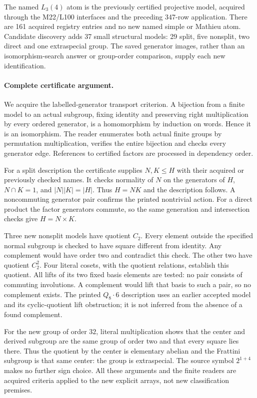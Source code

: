 \documentclass[11pt]{article}
\begin{document}
The named $L_3(4)$ atom is the previously certified projective model,
acquired through the M22/L100 interfaces and the preceding 347-row
application. There are 161 acquired registry entries and no new named
simple or Mathieu atom. Candidate discovery adds 37 small structural
models: 29 split, five nonsplit, two direct and one extraspecial group.
The saved generator images, rather than an isomorphism-search answer or
group-order comparison, supply each new identification.
\newpage
\paragraph{Complete certificate argument.}
We acquire the labelled-generator transport criterion. A bijection from
a finite model to an actual subgroup, fixing identity and preserving
right multiplication by every ordered generator, is a homomorphism by
induction on words. Hence it is an isomorphism. The reader enumerates
both actual finite groups by permutation multiplication, verifies the
entire bijection and checks every generator edge. References to certified
factors are processed in dependency order.

For a split description the certificate supplies $N,K\leq H$ with their
acquired or previously checked names. It checks normality of $N$ on the
generators of $H$, $N\cap K=1$, and $|N||K|=|H|$. Thus $H=NK$ and the
description follows. A noncommuting generator pair confirms the printed
nontrivial action. For a direct product the factor generators commute,
so the same generation and intersection checks give $H=N\times K$.

Three new nonsplit models have quotient $C_2$. Every element outside the
specified normal subgroup is checked to have square different from
identity. Any complement would have order two and contradict this check.
The other two have quotient $C_2^2$. Four literal cosets, with the quotient
relations, establish this quotient. All lifts of its two fixed basis
elements are tested: no pair consists of commuting involutions. A
complement would lift that basis to such a pair, so no complement exists.
The printed $Q_8\mathbin{\cdot}6$ description uses an earlier accepted
model and its cyclic-quotient lift obstruction; it is not inferred from
the absence of a found complement.

For the new group of order $32$, literal multiplication shows that the
center and derived subgroup are the same group of order two and that
every square lies there. Thus the quotient by the center is elementary
abelian and the Frattini subgroup is that same center: the group is
extraspecial. The source symbol $2^{1+4}$ makes no further sign choice.
All these arguments and the finite readers are acquired criteria applied
to the new explicit arrays, not new classification premises.
\end{document}
